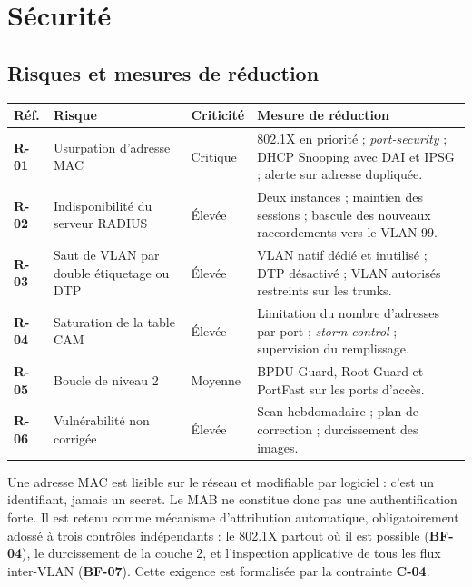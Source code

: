 \documentclass[11pt,a4paper]{article}
\newcommand{\rid}[1]{\textcolor{primary}{\textbf{\small #1}}}
\begin{document}
\section{Sécurité}

\subsection{Risques et mesures de réduction}\label{sec:risques}
\begin{table}[H]
\centering
\begin{tabularx}{\textwidth}{L{1.3cm} L{3.9cm} C{1.5cm} Y}
\toprule
{}\textbf{Réf.} & \textbf{Risque} & \textbf{Criticité} & \textbf{Mesure de réduction} \\
\midrule
\rid{R-01} & Usurpation d'adresse MAC & Critique & 802.1X en priorité ; \textit{port-security} ; DHCP Snooping avec DAI et IPSG ; alerte sur adresse dupliquée. \\
\rid{R-02} & Indisponibilité du serveur RADIUS & Élevée & Deux instances ; maintien des sessions ; bascule des nouveaux raccordements vers le VLAN 99. \\
\rid{R-03} & Saut de VLAN par double étiquetage ou DTP & Élevée & VLAN natif dédié et inutilisé ; DTP désactivé ; VLAN autorisés restreints sur les trunks. \\
\rid{R-04} & Saturation de la table CAM & Élevée & Limitation du nombre d'adresses par port ; \textit{storm-control} ; supervision du remplissage. \\
\rid{R-05} & Boucle de niveau 2 & Moyenne & BPDU Guard, Root Guard et PortFast sur les ports d'accès. \\
\rid{R-06} & Vulnérabilité non corrigée & Élevée & Scan hebdomadaire ; plan de correction ; durcissement des images. \\
\bottomrule
\end{tabularx}
\end{table}

\begin{alertbox}
Une adresse MAC est lisible sur le réseau et modifiable par logiciel : c'est un identifiant, jamais un secret. Le MAB ne constitue donc pas une authentification forte. Il est retenu comme mécanisme d'attribution automatique, obligatoirement adossé à trois contrôles indépendants : le 802.1X partout où il est possible (\rid{BF-04}), le durcissement de la couche 2, et l'inspection applicative de tous les flux inter-VLAN (\rid{BF-07}). Cette exigence est formalisée par la contrainte \rid{C-04}.
\end{alertbox}
\end{document}
